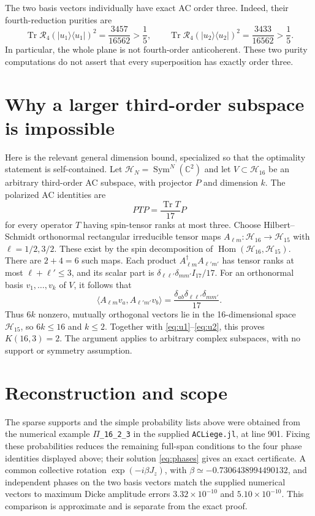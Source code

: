 \documentclass[11pt]{article}
\newcommand{\R}{\mathcal R}
\begin{document}
The two basis vectors individually have exact AC order three. Indeed,
their fourth-reduction purities are
\begin{equation}
 \operatorname{Tr}\R_4(\lvert u_1\rangle\langle u_1\rvert)^2
 =\frac{3457}{16562}>\frac15,\qquad
 \operatorname{Tr}\R_4(\lvert u_2\rangle\langle u_2\rvert)^2
 =\frac{3433}{16562}>\frac15.
\end{equation}
In particular, the whole plane is not fourth-order anticoherent.
These two purity computations do not assert that every superposition
has exactly order three.

\section{Why a larger third-order subspace is impossible}
Here is the relevant general dimension bound, specialized so that the
optimality statement is self-contained. Let
$\mathcal H_N=\operatorname{Sym}^N(\mathbb C^2)$ and let
$V\subset\mathcal H_{16}$ be an arbitrary third-order AC subspace,
with projector $P$ and dimension $k$.
The polarized AC identities are
\begin{equation}
 PTP=\frac{\operatorname{Tr}T}{17}P
\end{equation}
for every operator $T$ having spin-tensor ranks at most three.
Choose Hilbert--Schmidt orthonormal rectangular irreducible tensor maps
$A_{\ell m}:\mathcal H_{16}\to\mathcal H_{15}$ with
$\ell=1/2,3/2$. These exist by the spin decomposition of
$\operatorname{Hom}(\mathcal H_{16},\mathcal H_{15})$.
There are $2+4=6$ such maps. Each product
$A_{\ell m}^{\dagger}A_{\ell'm'}$ has tensor ranks at most
$\ell+\ell'\le3$, and its scalar part is
$\delta_{\ell\ell'}\delta_{mm'}I_{17}/17$.
For an orthonormal basis $v_1,\ldots,v_k$ of $V$, it follows that
\begin{equation}
 \langle A_{\ell m}v_a,A_{\ell'm'}v_b\rangle
 =\frac{\delta_{ab}\delta_{\ell\ell'}\delta_{mm'}}{17}.
\end{equation}
Thus $6k$ nonzero, mutually orthogonal vectors lie in the
16-dimensional space $\mathcal H_{15}$, so $6k\le16$ and $k\le2$.
Together with \eqref{eq:u1}--\eqref{eq:u2}, this proves $K(16,3)=2$.
The argument applies to arbitrary complex subspaces, with no support
or symmetry assumption.

\section{Reconstruction and scope}
The sparse supports and the simple probability lists above were obtained
from the numerical example \texttt{\(\Pi\)\_16\_2\_3} in the supplied
\texttt{ACLiege.jl}, at line 901. Fixing these probabilities reduces the
remaining full-span conditions to the four phase identities displayed
above; their solution \eqref{eq:phases} gives an exact certificate.
A common collective rotation $\exp(-i\beta J_z)$, with
$\beta\simeq-0.7306438994490132$, and independent phases on the two
basis vectors match the supplied numerical vectors to maximum Dicke
amplitude errors $3.32\times10^{-10}$ and $5.10\times10^{-10}$.
This comparison is approximate and is separate from the exact proof.
\end{document}
